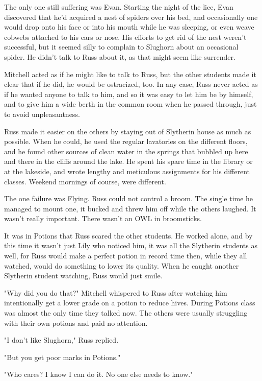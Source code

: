 The only one still suffering was Evan. Starting the night of the lice, Evan discovered that he'd acquired a nest of spiders over his bed, and occasionally one would drop onto his face or into his mouth while he was sleeping, or even weave cobwebs attached to his ears or nose. His efforts to get rid of the nest weren't successful, but it seemed silly to complain to Slughorn about an occasional spider. He didn't talk to Russ about it, as that might seem like surrender.

Mitchell acted as if he might like to talk to Russ, but the other students made it clear that if he did, he would be ostracized, too. In any case, Russ never acted as if he wanted anyone to talk to him, and so it was easy to let him be by himself, and to give him a wide berth in the common room when he passed through, just to avoid unpleasantness.

Russ made it easier on the others by staying out of Slytherin house as much as possible. When he could, he used the regular lavatories on the different floors, and he found other sources of clean water in the springs that bubbled up here and there in the cliffs around the lake. He spent his spare time in the library or at the lakeside, and wrote lengthy and meticulous assignments for his different classes. Weekend mornings of course, were different.

The one failure was Flying. Russ could not control a broom. The single time he managed to mount one, it bucked and threw him off while the others laughed. It wasn't really important. There wasn't an OWL in broomsticks.

It was in Potions that Russ scared the other students. He worked alone, and by this time it wasn't just Lily who noticed him, it was all the Slytherin students as well, for Russ would make a perfect potion in record time then, while they all watched, would do something to lower its quality. When he caught another Slytherin student watching, Russ would just smile.

"Why did you do that?" Mitchell whispered to Russ after watching him intentionally get a lower grade on a potion to reduce hives. During Potions class was almost the only time they talked now. The others were usually struggling with their own potions and paid no attention.

"I don't{\el} like Slughorn," Russ replied.

"But you get poor marks in Potions."

"Who cares? I know I can{\el} do it. No one{\el} else needs to know."


